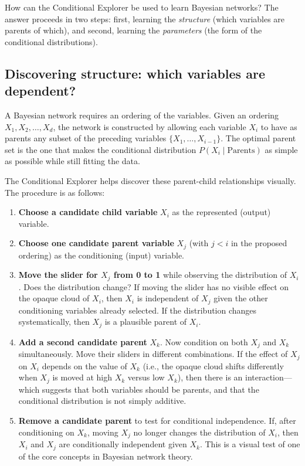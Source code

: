 How can the Conditional Explorer be used to learn Bayesian networks? The answer proceeds in two steps: first, learning the \emph{structure} (which variables are parents of which), and second, learning the \emph{parameters} (the form of the conditional distributions).

\subsection{Discovering structure: which variables are dependent?}

A Bayesian network requires an ordering of the variables. Given an ordering \(X_1, X_2, \dots, X_d\), the network is constructed by allowing each variable \(X_i\) to have as parents any subset of the preceding variables \(\{X_1, \dots, X_{i-1}\}\). The optimal parent set is the one that makes the conditional distribution \(P(X_i \mid \text{Parents})\) as simple as possible while still fitting the data.

The Conditional Explorer helps discover these parent-child relationships visually. The procedure is as follows:

\begin{enumerate}
    \item \textbf{Choose a candidate child variable} \(X_i\) as the represented (output) variable.
    \item \textbf{Choose one candidate parent variable} \(X_j\) (with \(j < i\) in the proposed ordering) as the conditioning (input) variable.
    \item \textbf{Move the slider for \(X_j\) from 0 to 1} while observing the distribution of \(X_i\). Does the distribution change? If moving the slider has no visible effect on the opaque cloud of \(X_i\), then \(X_i\) is independent of \(X_j\) given the other conditioning variables already selected. If the distribution changes systematically, then \(X_j\) is a plausible parent of \(X_i\).
    \item \textbf{Add a second candidate parent} \(X_k\). Now condition on both \(X_j\) and \(X_k\) simultaneously. Move their sliders in different combinations. If the effect of \(X_j\) on \(X_i\) depends on the value of \(X_k\) (i.e., the opaque cloud shifts differently when \(X_j\) is moved at high \(X_k\) versus low \(X_k\)), then there is an interaction—which suggests that both variables should be parents, and that the conditional distribution is not simply additive.
    \item \textbf{Remove a candidate parent} to test for conditional independence. If, after conditioning on \(X_k\), moving \(X_j\) no longer changes the distribution of \(X_i\), then \(X_i\) and \(X_j\) are conditionally independent given \(X_k\). This is a visual test of one of the core concepts in Bayesian network theory.
\end{enumerate}

